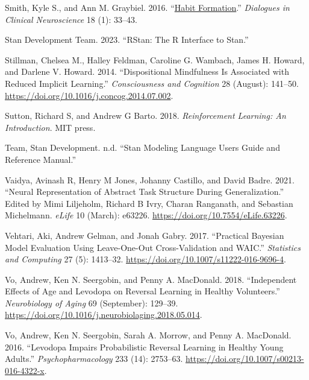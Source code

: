 \documentclass{article}
\newlength{\cslhangindent}
\newlength{\cslentryspacingunit} %
\newenvironment{CSLReferences}[2] %
 {%
  \setlength{\parindent}{0pt}
  \ifodd #1
  \let\oldpar\par
  \def\par{\hangindent=\cslhangindent\oldpar}
  \fi
  \setlength{\parskip}{#2\cslentryspacingunit}
 }%
 {}
\begin{document}
\begin{CSLReferences}{1}{0}
\leavevmode{}%
Smith, Kyle S., and Ann M. Graybiel. 2016.
{``\href{https://www.ncbi.nlm.nih.gov/pmc/articles/PMC4826769}{Habit
Formation}.''} \emph{Dialogues in Clinical Neuroscience} 18 (1): 33--43.

\leavevmode{}%
Stan Development Team. 2023. {``{RStan}: The {R} Interface to {Stan}.''}

\leavevmode{}%
Stillman, Chelsea M., Halley Feldman, Caroline G. Wambach, James H.
Howard, and Darlene V. Howard. 2014. {``Dispositional Mindfulness Is
Associated with Reduced Implicit Learning.''} \emph{Consciousness and
Cognition} 28 (August): 141--50.
\url{https://doi.org/10.1016/j.concog.2014.07.002}.

\leavevmode{}%
Sutton, Richard S, and Andrew G Barto. 2018. \emph{Reinforcement
Learning: {An} Introduction}. {MIT press}.

\leavevmode{}%
Team, Stan Development. n.d. {``Stan {Modeling Language Users Guide} and
{Reference Manual}.''}

\leavevmode{}%
Vaidya, Avinash R, Henry M Jones, Johanny Castillo, and David Badre.
2021. {``Neural Representation of Abstract Task Structure During
Generalization.''} Edited by Mimi Liljeholm, Richard B Ivry, Charan
Ranganath, and Sebastian Michelmann. \emph{eLife} 10 (March): e63226.
\url{https://doi.org/10.7554/eLife.63226}.

\leavevmode{}%
Vehtari, Aki, Andrew Gelman, and Jonah Gabry. 2017. {``Practical
{Bayesian} Model Evaluation Using Leave-One-Out Cross-Validation and
{WAIC}.''} \emph{Statistics and Computing} 27 (5): 1413--32.
\url{https://doi.org/10.1007/s11222-016-9696-4}.

\leavevmode{}%
Vo, Andrew, Ken N. Seergobin, and Penny A. MacDonald. 2018.
{``Independent Effects of Age and Levodopa on Reversal Learning in
Healthy Volunteers.''} \emph{Neurobiology of Aging} 69 (September):
129--39. \url{https://doi.org/10.1016/j.neurobiolaging.2018.05.014}.

\leavevmode{}%
Vo, Andrew, Ken N. Seergobin, Sarah A. Morrow, and Penny A. MacDonald.
2016. {``Levodopa Impairs Probabilistic Reversal Learning in Healthy
Young Adults.''} \emph{Psychopharmacology} 233 (14): 2753--63.
\url{https://doi.org/10.1007/s00213-016-4322-x}.


\end{CSLReferences}
\end{document}
